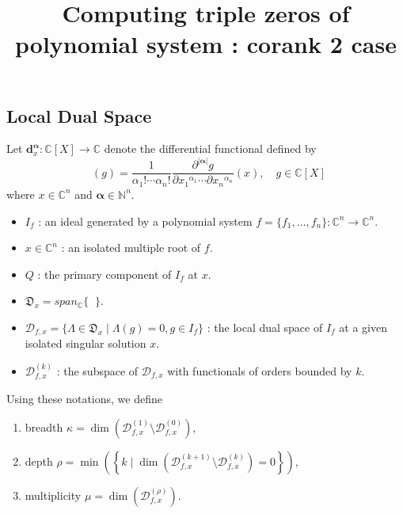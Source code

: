 \documentclass[12pt,oneside,reqno]{amsart}
\title{Computing triple zeros of polynomial system : corank 2 case}
\theoremstyle{definition}
\DeclareMathOperator{\diffop}{\mathbf{d}^\mathbf{\alpha}_x}
\begin{document}
\maketitle
\subsection{Local Dual Space}
Let $\mathbf{d}^\mathbf{\alpha}_x :\mathbb{C}[X]\rightarrow \mathbb{C}$ denote the differential functional defined by
\[\diffop(g)=\frac{1}{\alpha_1!\cdots \alpha_n!}\frac{\partial^{|\mathbf{\alpha}|}g}{\partial {x_1}^{\alpha_1}\cdots \partial{x_n}^{\alpha_n}}(x), \quad g\in \mathbb{C}[X]\]
where $x\in \mathbb{C}^n$ and $\mathbf{\alpha}\in \mathbb{N}^n$.

\begin{itemize}
	\item $I_f$ : an ideal generated by a polynomial system $f=\{f_1,\dots, f_n\}:\mathbb{C}^n\rightarrow\mathbb{C}^n$.
	\item $x\in \mathbb{C}^n$ : an isolated multiple root of $f$.
	\item $Q$ : the primary component of $I_f$ at $x$.
	\item $\mathfrak{D}_x=span_\mathbb{C}\{\diffop\}$.
	\item $\mathcal{D}_{f,x}=\{\Lambda \in \mathfrak{D}_x \mid \Lambda(g)=0, g\in I_f\}$ : the local dual space of $I_f$ at a given isolated singular solution $x$.
	\item $\mathcal{D}_{f,x}^{(k)}$ : the subspace of $\mathcal{D}_{f,x}$ with functionals of orders bounded by $k$.
\end{itemize}
Using these notations, we define
\begin{enumerate}
	\item breadth $\kappa = \dim\left(\mathcal{D}_{f,x}^{(1)}\setminus\mathcal{D}_{f,x}^{(0)}\right)$,
	\item depth $\rho = \min\left(\left\{k\mid \dim\left(\mathcal{D}_{f,x}^{(k+1)}\setminus\mathcal{D}_{f,x}^{(k)}\right)=0\right\}\right)$,
	\item multiplicity $\mu = \dim \left(\mathcal{D}_{f,x}^{(\rho)}\right)$.
\end{enumerate}
\end{document}
